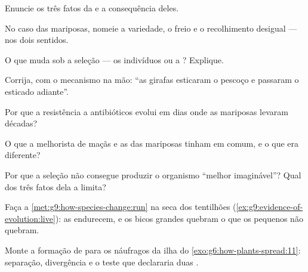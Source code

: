 \begin{exercise}[$\star$]\label{exo:g9:how-species-change:1}
Enuncie os três fatos da  e a consequência
deles.
\end{exercise}

\begin{exercise}[$\star$]\label{exo:g9:how-species-change:2}
No caso das mariposas, nomeie a variedade, o freio e o
recolhimento desigual --- nos dois sentidos.
\end{exercise}

\begin{exercise}[$\star$]\label{exo:g9:how-species-change:3}
O que muda sob a seleção --- os indivíduos ou a ?
Explique.
\end{exercise}

\begin{exercise}[$\star$]\label{exo:g9:how-species-change:4}
Corrija, com o mecanismo na mão: ``as girafas esticaram o
pescoço e passaram o esticado adiante''.
\end{exercise}

\begin{exercise}[$\star$]\label{exo:g9:how-species-change:5}
Por que a resistência a antibióticos evolui em dias onde as
mariposas levaram décadas?
\end{exercise}

\begin{exercise}[$\star$]\label{exo:g9:how-species-change:6}
O que a melhorista de maçãs e as  das mariposas tinham em
comum, e o que era diferente?
\end{exercise}

\begin{exercise}[$\star\star$]\label{exo:g9:how-species-change:7}
Por que a seleção não consegue produzir o organismo ``melhor
imaginável''? Qual dos três fatos dela a limita?
\end{exercise}

\begin{exercise}[$\star\star$]\label{exo:g9:how-species-change:8}
Faça a \cref{met:g9:how-species-change:run} na seca dos
tentilhões (\cref{ex:g9:evidence-of-evolution:live}): as
 endurecem, e os bicos grandes quebram o que os
pequenos não quebram.
\end{exercise}

\begin{exercise}[$\star\star$]\label{exo:g9:how-species-change:9}
Monte a formação de  para os náufragos da ilha do
\cref{exo:g6:how-plants-spread:11}: separação, divergência e
o teste que declararia duas .
\end{exercise}

